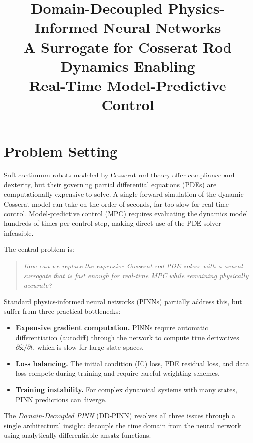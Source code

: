 \documentclass[11pt]{article}
\title{\textbf{Domain-Decoupled Physics-Informed Neural Networks}\\[0.3em]
\large A Surrogate for Cosserat Rod Dynamics Enabling\\Real-Time Model-Predictive Control}
\author{}
\date{}
\newcommand{\xhat}{\hat{\bm{x}}}
\begin{document}
\maketitle
\thispagestyle{empty}

\section{Problem Setting}

Soft continuum robots modeled by Cosserat rod theory offer compliance and dexterity, but their governing partial differential equations (PDEs) are computationally expensive to solve. A single forward simulation of the dynamic Cosserat model can take on the order of seconds, far too slow for real-time control. Model-predictive control (MPC) requires evaluating the dynamics model hundreds of times per control step, making direct use of the PDE solver infeasible.

The central problem is:
\begin{quote}
\emph{How can we replace the expensive Cosserat rod PDE solver with a neural surrogate that is fast enough for real-time MPC while remaining physically accurate?}
\end{quote}

Standard physics-informed neural networks (PINNs) partially address this, but suffer from three practical bottlenecks:
\begin{itemize}
    \item \textbf{Expensive gradient computation.} PINNs require automatic differentiation (autodiff) through the network to compute time derivatives $\partial \xhat / \partial t$, which is slow for large state spaces.
    \item \textbf{Loss balancing.} The initial condition (IC) loss, PDE residual loss, and data loss compete during training and require careful weighting schemes.
    \item \textbf{Training instability.} For complex dynamical systems with many states, PINN predictions can diverge.
\end{itemize}

The \emph{Domain-Decoupled PINN} (DD-PINN) resolves all three issues through a single architectural insight: decouple the time domain from the neural network using analytically differentiable ansatz functions.

\end{document}
